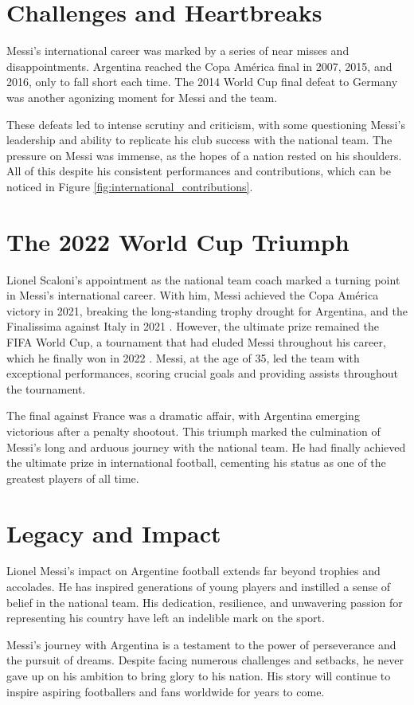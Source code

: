 \section{Challenges and Heartbreaks}

Messi's international career was marked by a series of near misses and 
disappointments.
Argentina reached the Copa América final in 2007, 2015, and 2016, only to 
fall short each time.
The 2014 World Cup final defeat to Germany was another agonizing moment for 
Messi and the team. 



These defeats led to intense scrutiny and criticism, with some questioning 
Messi's leadership and ability to replicate his club success with the national
team.
The pressure on Messi was immense, as the hopes of a nation rested on his 
shoulders.
All of this despite his consistent performances and contributions, which
can be noticed in Figure \ref{fig:international_contributions}.

\section{The 2022 World Cup Triumph}

Lionel Scaloni's appointment as the national team coach marked a turning point
in Messi's international career.
With him, Messi achieved the Copa América victory in 2021, breaking the
long-standing trophy drought for Argentina, and the Finalissima against 
Italy in 2021 \parencite{messi2021copa, messi2022finalissima}.
However, the ultimate prize remained the FIFA World Cup, a tournament that had
eluded Messi throughout his career, which he finally won in 2022
\parencite{messi2022wc}.
Messi, at the age of 35, led the team with exceptional performances, scoring 
crucial goals and providing assists throughout the tournament.

The final against France \parencite{france2022wc} was a dramatic affair, with 
Argentina emerging victorious after a penalty shootout.
This triumph marked the culmination of Messi's long and arduous journey with 
the national team.
He had finally achieved the ultimate prize in international football, cementing 
his status as one of the greatest players of all time.



\section{Legacy and Impact}

Lionel Messi's impact on Argentine football extends far beyond trophies and 
accolades.
He has inspired generations of young players and instilled a sense of belief in
the national team. His dedication, resilience, and unwavering passion for 
representing his country have left an indelible mark on the sport.

Messi's journey with Argentina is a testament to the power of perseverance and 
the pursuit of dreams.
Despite facing numerous challenges and setbacks, he never gave up on his 
ambition to bring glory to his nation. His story will continue to inspire 
aspiring footballers and fans worldwide for years to come.
